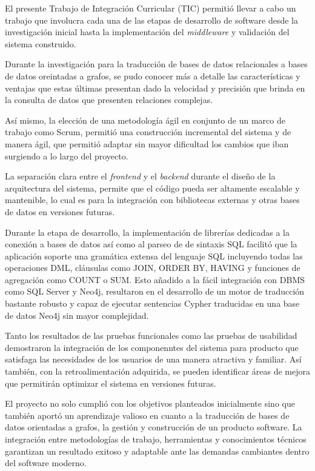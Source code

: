 El presente Trabajo de Integración Curricular (TIC) permitió llevar a cabo un trabajo que involucra cada una de las etapas de desarrollo de software desde la investigación inicial hasta la implementación del \textit{middleware} y validación del sistema construido.

Durante la investigación para la traducción de bases de datos relacionales a bases de datos oreintadas a grafos, se pudo conocer más a detalle las características y ventajas que estas últimas presentan dado la velocidad y precisión que brinda en la consulta de datos que presenten relaciones complejas.

Así mismo, la elección de una metodología ágil en conjunto de un marco de trabajo como Scrum, permitió una construcción incremental del sistema y de manera ágil, que permitió adaptar sin mayor dificultad los cambios que iban surgiendo a lo largo del proyecto.

La separación clara entre el \textit{frontend} y el \textit{backend} durante el diseño de la arquitectura del sistema, permite que el código pueda ser altamente escalable y mantenible, lo cual es para la integración con bibliotecas externas y otras bases de datos en versiones futuras.

Durante la etapa de desarrollo, la implementación de librerías dedicadas a la conexión a bases de datos así como al parseo de de sintaxis SQL facilitó que la aplicación soporte una gramática extensa del lenguaje SQL incluyendo todas las operaciones DML, cláusulas como JOIN, ORDER BY, HAVING y funciones de agregación como COUNT o SUM. Esto añadido a la fácil integración con DBMS como SQL Server y Neo4j, resultaron en el desarrollo de un motor de traducción bastante robusto y capaz de ejecutar sentencias Cypher traducidas en una base de datos Neo4j sin mayor complejidad.

Tanto los resultados de las pruebas funcionales como las pruebas de usabilidad demostraron la integración de los componenntes del sistema para producto que satisfaga las necesidades de los usuarios de una manera atractiva y familiar. Así también, con la retroalimentación adquirida, se pueden identificar áreas de mejora que permitirán optimizar el sistema en versiones futuras.

El proyecto no solo cumplió con los objetivos planteados inicialmente sino que también aportó un aprendizaje valioso en cuanto a la traducción de bases de datos orientadas a grafos, la gestión y construcción de un producto software. La integración entre metodologías de trabajo, herramientas y conocimientos técnicos garantizan un resultado exitoso y adaptable ante las demandas cambiantes dentro del software moderno.